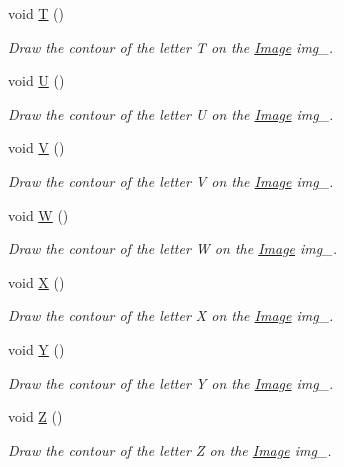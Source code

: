 \begin{DoxyCompactItemize}
void \mbox{\hyperlink{class_font_v1_ab520e2522e89b6ff20e42621080edd7d}{T}} ()
\begin{DoxyCompactList}\small\item\em Draw the contour of the letter T on the \mbox{\hyperlink{class_image}{Image}} img\+\_\+. \end{DoxyCompactList}\item 
void \mbox{\hyperlink{class_font_v1_a460d625b76b123ba4e67a21091d7dcce}{U}} ()
\begin{DoxyCompactList}\small\item\em Draw the contour of the letter U on the \mbox{\hyperlink{class_image}{Image}} img\+\_\+. \end{DoxyCompactList}\item 
void \mbox{\hyperlink{class_font_v1_aa5937063bd49c25ccd8993d375926fb7}{V}} ()
\begin{DoxyCompactList}\small\item\em Draw the contour of the letter V on the \mbox{\hyperlink{class_image}{Image}} img\+\_\+. \end{DoxyCompactList}\item 
void \mbox{\hyperlink{class_font_v1_aa4e67840b676dfffd3e03d873013174c}{W}} ()
\begin{DoxyCompactList}\small\item\em Draw the contour of the letter W on the \mbox{\hyperlink{class_image}{Image}} img\+\_\+. \end{DoxyCompactList}\item 
void \mbox{\hyperlink{class_font_v1_a8a93144edcf0f9bf1ac9017eb916ff82}{X}} ()
\begin{DoxyCompactList}\small\item\em Draw the contour of the letter X on the \mbox{\hyperlink{class_image}{Image}} img\+\_\+. \end{DoxyCompactList}\item 
void \mbox{\hyperlink{class_font_v1_a25827e105e44581040d8c17cc821e4f3}{Y}} ()
\begin{DoxyCompactList}\small\item\em Draw the contour of the letter Y on the \mbox{\hyperlink{class_image}{Image}} img\+\_\+. \end{DoxyCompactList}\item 
void \mbox{\hyperlink{class_font_v1_a10df574bc5aa14a43988d42db4e89504}{Z}} ()
\begin{DoxyCompactList}\small\item\em Draw the contour of the letter Z on the \mbox{\hyperlink{class_image}{Image}} img\+\_\+. \end{DoxyCompactList}\end{DoxyCompactItemize}
